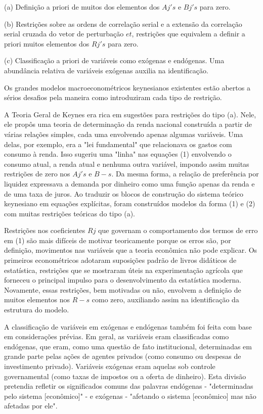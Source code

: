 \documentclass[12pt]{article}
\begin{document}
(a) Definição a priori de muitos dos elementos dos $Aj's$ e $Bj's$ para zero.

(b) Restrições sobre as ordens de correlação serial e a extensão da correlação serial cruzada do vetor de perturbação $et$, restrições que equivalem a definir a priori muitos elementos dos $Rj's$ para zero.

(c) Classificação a priori de variáveis como exógenas e endógenas. Uma abundância relativa de variáveis exógenas auxilia na identificação.

Os grandes modelos macroeconométricos keynesianos existentes estão abertos a sérios desafios pela maneira como introduziram cada tipo de restrição.

A Teoria Geral de Keynes era rica em sugestões para restrições do tipo (a). Nele, ele propôs uma teoria de determinação da renda nacional construída a partir de várias relações simples, cada uma envolvendo apenas algumas variáveis. Uma delas, por exemplo, era a "lei fundamental" que relacionava os gastos com consumo à renda. Isso sugeriu uma "linha" nas equações (1) envolvendo o consumo atual, a renda atual e nenhuma outra variável, impondo assim muitas restrições de zero nos $Aj's$ e $B-s$. Da mesma forma, a relação de preferência por liquidez expressava a demanda por dinheiro como uma função apenas da renda e de uma taxa de juros. Ao traduzir os blocos de construção do sistema teórico keynesiano em equações explícitas, foram construídos modelos da forma (1) e (2) com muitas restrições teóricas do tipo (a).

Restrições nos coeficientes $Rj$ que governam o comportamento dos termos de erro em (1) são mais difíceis de motivar teoricamente porque os erros são, por definição, movimentos nas variáveis que a teoria econômica não pode explicar. Os primeiros econométricos adotaram suposições padrão de livros didáticos de estatística, restrições que se mostraram úteis na experimentação agrícola que forneceu o principal impulso para o desenvolvimento da estatística moderna. Novamente, essas restrições, bem motivadas ou não, envolvem a definição de muitos elementos nos $R-s$ como zero, auxiliando assim na identificação da estrutura do modelo.

A classificação de variáveis em exógenas e endógenas também foi feita com base em considerações prévias. Em geral, as variáveis eram classificadas como endógenas, que eram, como uma questão de fato institucional, determinadas em grande parte pelas ações de agentes privados (como consumo ou despesas de investimento privado). Variáveis exógenas eram aquelas sob controle governamental (como taxas de impostos ou a oferta de dinheiro). Esta divisão pretendia refletir os significados comuns das palavras endógenas - "determinadas pelo sistema [econômico]" - e exógenas - "afetando o sistema [econômico] mas não afetadas por ele".
\end{document}

